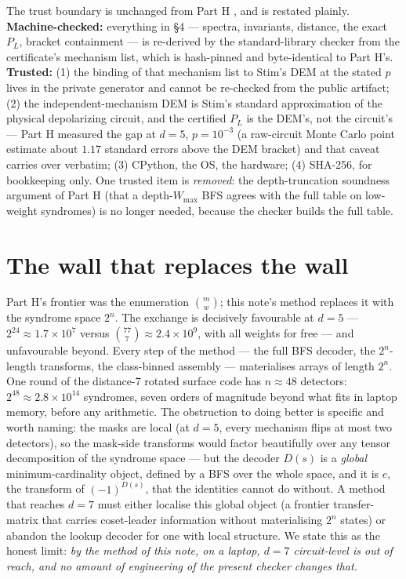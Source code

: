 \documentclass[11pt]{amsart}
\newcommand{\PL}{P_{L}}
\theoremstyle{plain}
\theoremstyle{definition}
\theoremstyle{remark}
\begin{document}
The trust boundary is unchanged from Part H \cite{PartH}, and is restated
plainly. \textbf{Machine-checked:} everything in \S4 --- spectra,
invariants, distance, the exact $\PL$, bracket containment --- is re-derived
by the standard-library checker from the certificate's mechanism list, which
is hash-pinned and byte-identical to Part H's. \textbf{Trusted:} (1) the
binding of that mechanism list to Stim's DEM at the stated $p$ lives in the
private generator and cannot be re-checked from the public artifact; (2) the
independent-mechanism DEM is Stim's standard approximation of the physical
depolarizing circuit, and the certified $\PL$ is the DEM's, not the
circuit's --- Part H measured the gap at $d=5$, $p=10^{-3}$ (a raw-circuit
Monte Carlo point estimate about $1.17$ standard errors above the DEM
bracket) and that caveat carries over verbatim; (3) CPython, the OS, the
hardware; (4) SHA-256, for bookkeeping only. One trusted item is
\emph{removed}: the depth-truncation soundness argument of Part H (that a
depth-$W_{\max}$ BFS agrees with the full table on low-weight syndromes) is
no longer needed, because the checker builds the full table.

\section{The wall that replaces the wall}\label{sec:wall}

Part H's frontier was the enumeration $\binom{m}{w}$; this note's method
replaces it with the syndrome space $2^n$. The exchange is decisively
favourable at $d = 5$ --- $2^{24} \approx 1.7 \times 10^7$ versus
$\binom{77}{7} \approx 2.4 \times 10^9$, with all weights for free --- and
unfavourable beyond. Every step of the method --- the full BFS decoder, the
$2^n$-length transforms, the class-binned assembly --- materialises arrays
of length $2^n$. One round of the distance-7 rotated surface code has $n
\approx 48$ detectors: $2^{48} \approx 2.8 \times 10^{14}$ syndromes, seven
orders of magnitude beyond what fits in laptop memory, before any
arithmetic. The obstruction to doing better is specific and worth naming:
the masks are local (at $d=5$, every mechanism flips at most two detectors),
so the mask-side transforms would factor beautifully over any tensor
decomposition of the syndrome space --- but the decoder $D(s)$ is a
\emph{global} minimum-cardinality object, defined by a BFS over the whole
space, and it is $\widehat{e}$, the transform of $(-1)^{D(s)}$, that the
identities cannot do without. A method that reaches $d = 7$ must either
localise this global object (a frontier transfer-matrix that carries
coset-leader information without materialising $2^n$ states) or abandon the
lookup decoder for one with local structure. We state this as the honest
limit: \emph{by the method of this note, on a laptop, $d = 7$ circuit-level
is out of reach, and no amount of engineering of the present checker
changes that.}
\end{document}
